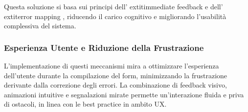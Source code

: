Questa soluzione si basa sui principi dell’	extit{immediate feedback} e dell’	extit{error mapping} \cite{shneiderman2004}, riducendo il carico cognitivo e migliorando l’usabilità complessiva del sistema.
\newline
\subsubsection{Esperienza Utente e Riduzione della Frustrazione}
L’implementazione di questi meccanismi mira a ottimizzare l’esperienza dell’utente durante la compilazione del form, minimizzando la frustrazione derivante dalla correzione degli errori. La combinazione di feedback visivo, animazioni intuitive e segnalazioni mirate permette un’interazione fluida e priva di ostacoli, in linea con le best practice in ambito UX.


